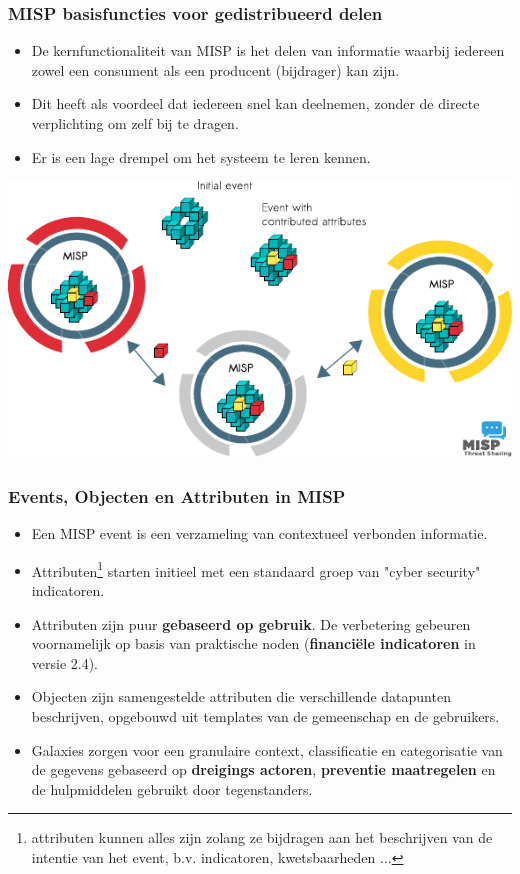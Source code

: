 \begin{frame}
\frametitle{MISP basisfuncties voor gedistribueerd delen}
\begin{itemize}
\item De kernfunctionaliteit van MISP is het delen van informatie waarbij iedereen zowel een consument als een producent (bijdrager) kan zijn.
\item Dit heeft als voordeel dat iedereen snel kan deelnemen, zonder de directe verplichting om zelf bij te dragen.
\item Er is een lage drempel om het systeem te leren kennen.
\end{itemize}
\includegraphics[scale=0.9]{misp-distributed.pdf}
\end{frame}


\begin{frame}
        \frametitle{Events, Objecten en Attributen in MISP}
         \begin{itemize}
                \item Een MISP event is een verzameling van contextueel verbonden informatie.
                \item Attributen\footnote{attributen kunnen alles zijn zolang ze bijdragen aan het beschrijven van de intentie van het event, b.v. indicatoren, kwetsbaarheden ... } starten initieel met een standaard groep van "cyber security" indicatoren.
                \item Attributen zijn puur {\bf gebaseerd op gebruik}. De verbetering gebeuren voornamelijk op basis van praktische noden ({\bf financiële indicatoren} in versie 2.4).
                \item Objecten zijn samengestelde attributen die verschillende datapunten beschrijven, opgebouwd uit templates van de gemeenschap en de gebruikers.
                \item Galaxies zorgen voor een granulaire context, classificatie en categorisatie van de gegevens gebaseerd op {\bf dreigings actoren}, {\bf preventie  maatregelen} en de hulpmiddelen gebruikt door tegenstanders.
        \end{itemize}
\end{frame}

